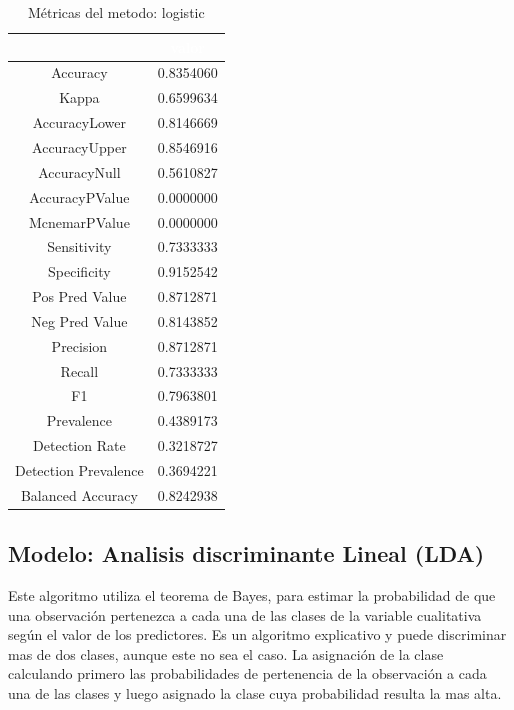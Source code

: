 \begin{table}[!h]
	
	\caption{\label{tab:metricas_logistic}Métricas del metodo: logistic }
	\centering
	\begin{tabular}[t]{cc}
		\toprule
		\rowcolor{black}  \multicolumn{1}{c}{\textcolor{white}{\textbf{metricas}}} & \multicolumn{1}{c}{\textcolor{white}{\textbf{valor}}}\\
		\midrule
		\rowcolor{gray!6}  Accuracy & 0.8354060\\
		Kappa & 0.6599634\\
		\rowcolor{gray!6}  AccuracyLower & 0.8146669\\
		AccuracyUpper & 0.8546916\\
		\rowcolor{gray!6}  AccuracyNull & 0.5610827\\
		\addlinespace
		AccuracyPValue & 0.0000000\\
		\rowcolor{gray!6}  McnemarPValue & 0.0000000\\
		Sensitivity & 0.7333333\\
		\rowcolor{gray!6}  Specificity & 0.9152542\\
		Pos Pred Value & 0.8712871\\
		\addlinespace
		\rowcolor{gray!6}  Neg Pred Value & 0.8143852\\
		Precision & 0.8712871\\
		\rowcolor{gray!6}  Recall & 0.7333333\\
		F1 & 0.7963801\\
		\rowcolor{gray!6}  Prevalence & 0.4389173\\
		\addlinespace
		Detection Rate & 0.3218727\\
		\rowcolor{gray!6}  Detection Prevalence & 0.3694221\\
		Balanced Accuracy & 0.8242938\\
		\bottomrule
	\end{tabular}
\end{table}




\subsection{Modelo: Analisis discriminante Lineal
	(LDA)}

Este algoritmo utiliza el teorema de Bayes, para estimar la probabilidad
de que una observación pertenezca a cada una de las clases de la
variable cualitativa según el valor de los predictores. Es un algoritmo
explicativo y puede discriminar mas de dos clases, aunque este no sea el
caso. La asignación de la clase calculando primero las probabilidades de
pertenencia de la observación a cada una de las clases y luego
asignado la clase cuya probabilidad resulta la mas alta.



